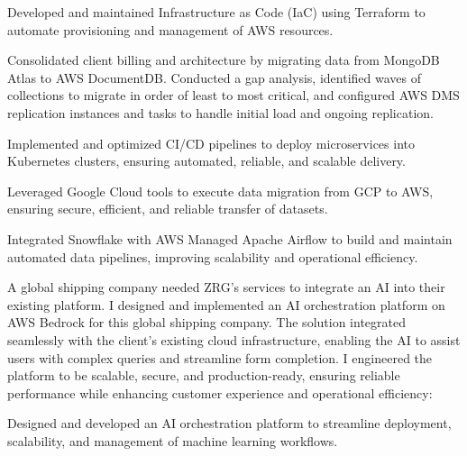 \begin{cventries}
{      \begin{cvitems}
          \item []
          \item Developed and maintained Infrastructure as Code (IaC) using Terraform to automate provisioning and management of AWS resources.
          \item Consolidated client billing and architecture by migrating data from MongoDB Atlas to AWS DocumentDB. Conducted a gap analysis, identified waves of collections to migrate in order of least to most critical, and configured AWS DMS replication instances and tasks to handle initial load and ongoing replication.
          \item Implemented and optimized CI/CD pipelines to deploy microservices into Kubernetes clusters, ensuring automated, reliable, and scalable delivery.
          \item Leveraged Google Cloud tools to execute data migration from GCP to AWS, ensuring secure, efficient, and reliable transfer of datasets.
          \item Integrated Snowflake with AWS Managed Apache Airflow to build and maintain automated data pipelines, improving scalability and operational efficiency.
      \end{cvitems}
          A global shipping company needed ZRG's services to integrate an AI into their existing platform. I designed and implemented an AI orchestration platform on AWS Bedrock for this global shipping company. The solution integrated seamlessly with the client's existing cloud infrastructure, enabling the AI to assist users with complex queries and streamline form completion. I engineered the platform to be scalable, secure, and production-ready, ensuring reliable performance while enhancing customer experience and operational efficiency:
      \begin{cvitems}
          \item[]
          \item Designed and developed an AI orchestration platform to streamline deployment, scalability, and management of machine learning workflows.
        \end{cvitems}
    }


\end{cventries}
